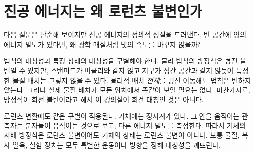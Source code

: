 \begin{classroomqa}
\end{classroomqa}

\begin{classroomqa}
\end{classroomqa}

\section{진공 에너지는 왜 로런츠 불변인가}

다음 질문은 단순해 보이지만 진공 에너지의 정의적 성질을 드러낸다. 빈 공간에 양의 에너지 밀도가 있다면, 왜 광학 매질처럼 빛의 속도를 바꾸지 않을까?

\begin{classroomqa}
\end{classroomqa}

법칙의 대칭성과 특정 상태의 대칭성을 구별해야 한다. 물리 법칙의 방정식은 병진 불변일 수 있지만, 스탠퍼드가 버클리와 같지 않고 지구가 성간 공간과 같지 않듯이 특정한 물질 배치는 그렇지 않을 수 있다. 물리적 배치 \emph{전체}를 병진 이동해도 법칙은 변하지 않는다. 그러나 실제 물질 배치가 모든 위치에서 똑같아 보일 필요는 없다. 마찬가지로, 방정식이 회전 불변이라고 해서 이 강의실이 회전 대칭인 것은 아니다.

로런츠 변환에도 같은 구별이 적용된다. 기체에는 정지계가 있다. 그 안을 움직이는 관측자는 분자들이 움직이는 것으로 보고, 다른 에너지 밀도를 측정한다. 따라서 기체의 지배 방정식은 로런츠 불변이어도 기체의 상태는 로런츠 불변이 아니다. 보통 물질, 복사 열욕, 실험 장치는 모두 특별한 운동이나 방향을 정해 대칭성을 깨뜨린다.

